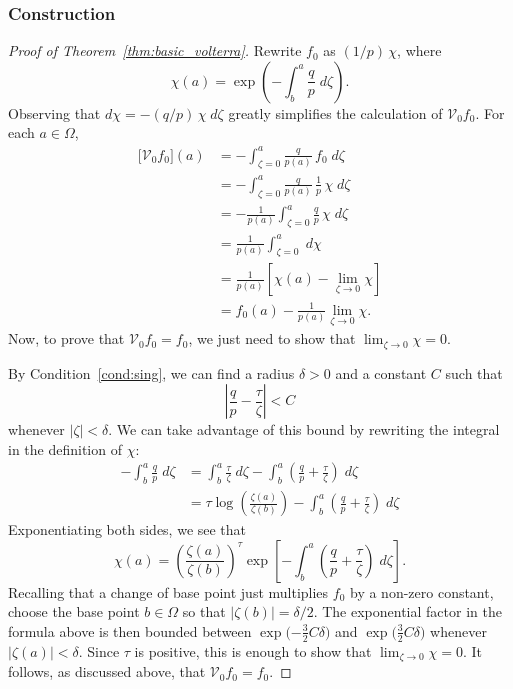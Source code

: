 \documentclass{article}
\theoremstyle{plain}
\newcommand{\hardpart}{\mathcal{V}_0}
\newcommand{\solproto}{f_0}
\newcommand{\domain}{\Omega}
\begin{document}
\subsubsection{Construction}\label{sec:construction}
\begin{proof}[Proof of Theorem~\ref{thm:basic_volterra}]
Rewrite $\solproto$ as $(1/p)\,\chi$, where
\[ \chi(a) = \exp\left(-\int_{b}^{a}\frac{q}{p}\;d\zeta\right). \]
Observing that $d\chi = -(q/p)\,\chi\;d\zeta$ greatly simplifies the calculation of $\hardpart \solproto$. For each $a \in \domain$,
\begin{align*}
\big[\hardpart \solproto\big](a) &= - \int_{\zeta=0}^{a} \frac{q}{p(a)}\,\solproto\;d\zeta \\
& = -\int_{\zeta=0}^{a} \frac{q}{p(a)}\,\frac{1}{p}\,\chi\;d\zeta \\
& = - \frac{1}{p(a)}  \int_{\zeta=0}^{a} \frac{q}{p}\,\chi\;d\zeta\\
& = \frac{1}{p(a)} \int_{\zeta=0}^{a}\;d\chi \\
& = \frac{1}{p(a)} \left[ \chi(a) - \lim_{\zeta \to 0} \chi \right] \\
& = \solproto(a) - \frac{1}{p(a)} \lim_{\zeta \to 0} \chi.
\end{align*}
Now, to prove that $\hardpart \solproto = \solproto$, we just need to show that $\lim_{\zeta \to 0} \chi = 0$.

By Condition~\eqref{cond:sing}, we can find a radius $\delta>0$ and a constant $C$ such that
\begin{equation}\label{eqn:sing-bound}
\left|\frac{q}{p} - \frac{\tau}{\zeta}\right| < C
\end{equation}
whenever $|\zeta| < \delta$. We can take advantage of this bound by rewriting the integral in the definition of $\chi$:
\begin{align*}
-\int_b^a \frac{q}{p}\;d\zeta & = \int_b^a \frac{\tau}{\zeta}\;d\zeta - \int_b^a \left( \frac{q}{p} + \frac{\tau}{\zeta} \right)\;d\zeta \\
& = \tau \log\left(\frac{\zeta(a)}{\zeta(b)}\right) - \int_b^a \left( \frac{q}{p} + \frac{\tau}{\zeta} \right)\;d\zeta
\end{align*}
Exponentiating both sides, we see that
\[ \chi(a) = \left(\frac{\zeta(a)}{\zeta(b)}\right)^\tau \exp\left[-\int_b^a \left( \frac{q}{p} + \frac{\tau}{\zeta} \right)\;d\zeta\right]. \]
Recalling that a change of base point just multiplies $\solproto$ by a non-zero constant, choose the base point $b \in \Omega$ so that $|\zeta(b)| = \delta/2$. The exponential factor in the formula above is then bounded between $\exp\big({-\tfrac{3}{2}C\delta}\big)$ and $\exp\big(\tfrac{3}{2}C\delta\big)$ whenever $|\zeta(a)| < \delta$. Since $\tau$ is positive, this is enough to show that $\lim_{\zeta \to 0} \chi = 0$. It follows, as discussed above, that $\hardpart \solproto = \solproto$. 
\end{proof}
\end{document}
